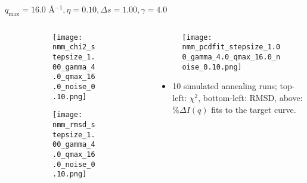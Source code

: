 \documentclass{beamer}
\begin{document}
\begin{frame}{$ q_{\textrm{max}}=16.0 $ \AA $^{-1}, \eta=0.10, \Delta s=1.00, \gamma=4.0$}
	\begin{columns}
		\begin{column}{.5\textwidth}
			\begin{figure}[H]
			\centering
			\begin{subfigure}[b]{\textwidth}
				\centering
				\texttt{[image: nmm\_chi2\_stepsize\_1.00\_gamma\_4.0\_qmax\_16.0\_noise\_0.10.png]}
				\label{fig:}
			\end{subfigure}
			\begin{subfigure}[b]{\textwidth}
				\centering
				\texttt{[image: nmm\_rmsd\_stepsize\_1.00\_gamma\_4.0\_qmax\_16.0\_noise\_0.10.png]}
				\label{fig:}
			\end{subfigure}
			\end{figure}
		\end{column}
		\begin{column}{.5\textwidth}
			\begin{figure}[H]
				\centering
				\texttt{[image: nmm\_pcdfit\_stepsize\_1.00\_gamma\_4.0\_qmax\_16.0\_noise\_0.10.png]}
				\label{fig:}
			\end{figure}
			\begin{itemize}
				\item 10 simulated annealing runs; top-left: $\chi^2$, bottom-left: RMSD, above: $\%\Delta I(q)$ fits to the target curve.
			\end{itemize}
		\end{column}
	\end{columns}
\end{frame}
 
\end{document}
